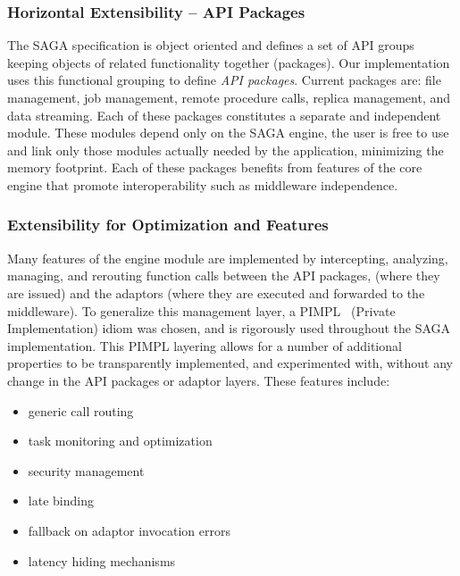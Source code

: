 \documentclass[conference,final]{IEEEtran}
\newcommand{\I}{\textit}
\newenvironment{shortlist}{
  \begin{itemize}
  \setlength{\itemsep}{-0.1em}
}{
  \end{itemize}
}
\begin{document}

\subsubsection{Horizontal Extensibility -- API Packages}
\label{ssec:apipackages}

The SAGA specification is object oriented and defines a set of API
groups keeping objects of related functionality together (packages).
Our implementation uses this functional grouping to define \I{API
  packages}. Current packages are: file management, job management,
remote procedure calls, replica management, and data streaming. Each
of these packages constitutes a separate and independent module.
These modules depend only on the SAGA engine, the user is free to use
and link only those modules actually needed by the application,
minimizing the memory footprint. Each of these packages benefits from
features of the core engine that promote interoperability such as
middleware independence.


\subsubsection{Extensibility for Optimization and Features} 

Many features of the engine module are implemented by intercepting,
analyzing, managing, and rerouting function calls between the API
packages, (where they are issued) and the adaptors (where they are
executed and forwarded to the middleware).  To generalize this
management layer, a PIMPL~\cite{pimpl} (Private Implementation) idiom
was chosen, and is rigorously used throughout the SAGA implementation.
This PIMPL layering allows for a number of additional properties to be
transparently implemented, and experimented with, without any change
in the API packages or adaptor layers.  These features include:
\begin{shortlist}
\item generic call routing
\item task monitoring and optimization
\item security management
\item late binding
\item fallback on adaptor invocation errors
\item latency hiding mechanisms
\end{shortlist}
\end{document}
